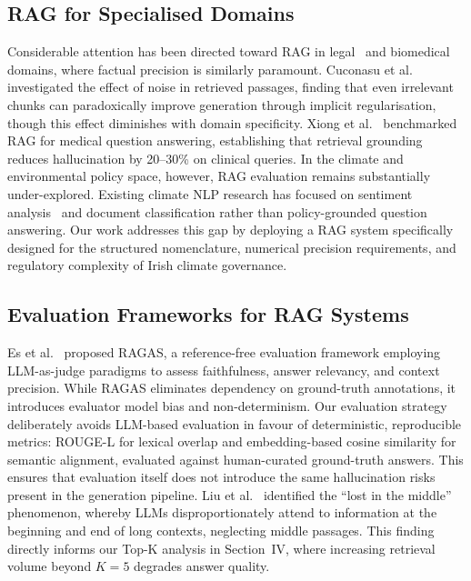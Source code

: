 \documentclass[conference]{IEEEtran}
\begin{document}
\subsection{RAG for Specialised Domains}

Considerable attention has been directed toward RAG in legal~\cite{cuconasu2024power} and biomedical~\cite{xiong2024benchmarking} domains, where factual precision is similarly paramount. Cuconasu et al.~\cite{cuconasu2024power} investigated the effect of noise in retrieved passages, finding that even irrelevant chunks can paradoxically improve generation through implicit regularisation, though this effect diminishes with domain specificity. Xiong et al.~\cite{xiong2024benchmarking} benchmarked RAG for medical question answering, establishing that retrieval grounding reduces hallucination by 20--30\% on clinical queries. In the climate and environmental policy space, however, RAG evaluation remains substantially under-explored. Existing climate NLP research has focused on sentiment analysis~\cite{stammbach2022dataset} and document classification rather than policy-grounded question answering. Our work addresses this gap by deploying a RAG system specifically designed for the structured nomenclature, numerical precision requirements, and regulatory complexity of Irish climate governance.

\subsection{Evaluation Frameworks for RAG Systems}

Es et al.~\cite{es2024ragas} proposed RAGAS, a reference-free evaluation framework employing LLM-as-judge paradigms to assess faithfulness, answer relevancy, and context precision. While RAGAS eliminates dependency on ground-truth annotations, it introduces evaluator model bias and non-determinism. Our evaluation strategy deliberately avoids LLM-based evaluation in favour of deterministic, reproducible metrics: ROUGE-L for lexical overlap and embedding-based cosine similarity for semantic alignment, evaluated against human-curated ground-truth answers. This ensures that evaluation itself does not introduce the same hallucination risks present in the generation pipeline. Liu et al.~\cite{liu2024lost} identified the ``lost in the middle'' phenomenon, whereby LLMs disproportionately attend to information at the beginning and end of long contexts, neglecting middle passages. This finding directly informs our Top-K analysis in Section~IV, where increasing retrieval volume beyond $K{=}5$ degrades answer quality.
\end{document}
